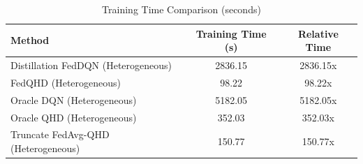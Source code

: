 \begin{table}[t]
\centering
\caption{Training Time Comparison (seconds)}
\label{tab:computation_cost}
\begin{tabular}{lcc}
\toprule
Method & Training Time (s) & Relative Time \\
\midrule
Distillation FedDQN (Heterogeneous) & 2836.15 & 2836.15x \\
FedQHD (Heterogeneous) & 98.22 & 98.22x \\
Oracle DQN (Heterogeneous) & 5182.05 & 5182.05x \\
Oracle QHD (Heterogeneous) & 352.03 & 352.03x \\
Truncate FedAvg-QHD (Heterogeneous) & 150.77 & 150.77x \\
\bottomrule
\end{tabular}
\end{table}